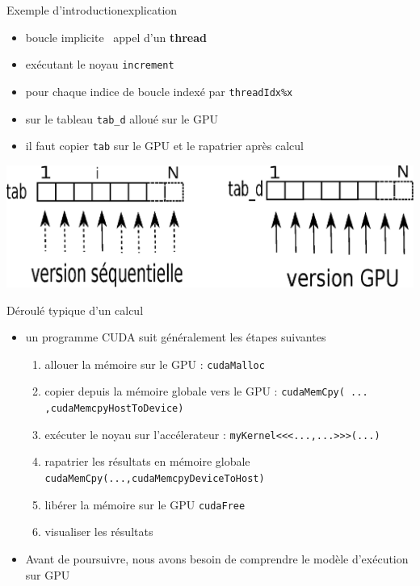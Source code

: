 \documentclass[11pt,mathserif]{beamer}
\newcommand{\gezi}{\faLongArrowRight}
\newcommand{\argi}{\faLightbulbO}
\newcommand{\kontuz}{\faExclamationTriangle}
\newcommand{\geldi}{\faHandPaperO}
\newif\ifC
\begin{document}
\begin{frame}{Exemple d'introduction}{explication}
\pause
\begin{itemize}[<+->]
\ifC
 \item[\argi] boucle \texttt{for} \gezi\ appel d'un {\bf thread}
\else
 \item[\argi] boucle implicite \gezi\ appel d'un {\bf thread}
\fi
 \item[\argi] exécutant le noyau \texttt{increment}
 \item[\argi] pour chaque indice de boucle indexé par \ifC \texttt{threadIdx.x} \else 
   \texttt{threadIdx\%x} \fi
 \item[\argi] sur le tableau \texttt{tab\_d} alloué sur le GPU
 \item[\kontuz] il faut copier \texttt{tab} sur le GPU et le rapatrier après calcul
\end{itemize}
\pause
\begin{center}
\includegraphics[width=0.9\linewidth]{fig/parallel.eps}
\end{center}
\end{frame}

\begin{frame}{Déroulé typique d'un calcul}
  \lstset{basicstyle=\ttfamily}
\pause
  \begin{itemize}[<+->]
    \item[\argi] un programme CUDA suit généralement les étapes suivantes 
\begin{enumerate}[<+->]
 \item allouer la mémoire sur le GPU : \lstinline!cudaMalloc!
 \item copier depuis la mémoire globale vers le GPU : \lstinline!cudaMemCpy( ... ,cudaMemcpyHostToDevice)!
 \item exécuter le noyau sur l'accélerateur : \lstinline!myKernel<<<...,...>>>(...)!
 \item rapatrier les résultats en mémoire globale \lstinline!cudaMemCpy(...,cudaMemcpyDeviceToHost)!
 \item libérer la mémoire sur le GPU \lstinline!cudaFree!
 \item visualiser les résultats
\end{enumerate}
\item[\geldi] Avant de poursuivre, nous avons besoin de comprendre le modèle d'exécution sur GPU
\end{itemize}
\end{frame}
\end{document}
